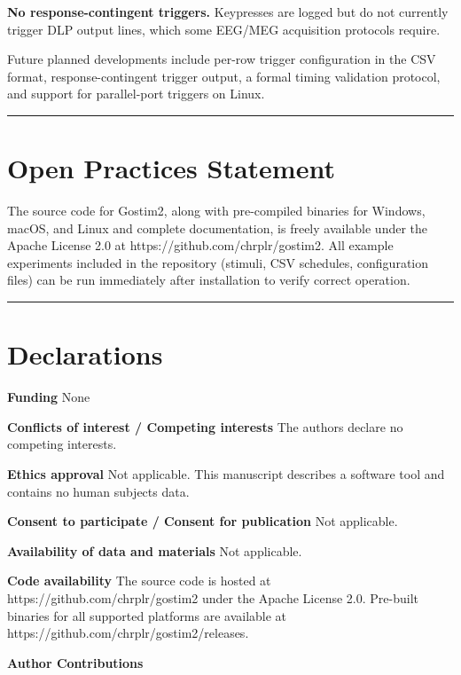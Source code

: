 \documentclass[
  11pt,
]{article}
\begin{document}
\textbf{No response-contingent triggers.} Keypresses are logged but do
not currently trigger DLP output lines, which some EEG/MEG acquisition
protocols require.

Future planned developments include per-row trigger configuration in the
CSV format, response-contingent trigger output, a formal timing
validation protocol, and support for parallel-port triggers on Linux.

\begin{center}\rule{0.5\linewidth}{0.5pt}\end{center}

\section{Open Practices Statement}\label{open-practices-statement}

The source code for Gostim2, along with pre-compiled binaries for
Windows, macOS, and Linux and complete documentation, is freely
available under the Apache License 2.0 at
https://github.com/chrplr/gostim2. All example experiments included in
the repository (stimuli, CSV schedules, configuration files) can be run
immediately after installation to verify correct operation.

\begin{center}\rule{0.5\linewidth}{0.5pt}\end{center}

\section{Declarations}\label{declarations}

\textbf{Funding} None

\textbf{Conflicts of interest / Competing interests} The authors declare
no competing interests.

\textbf{Ethics approval} Not applicable. This manuscript describes a
software tool and contains no human subjects data.

\textbf{Consent to participate / Consent for publication} Not
applicable.

\textbf{Availability of data and materials} Not applicable.

\textbf{Code availability} The source code is hosted at
https://github.com/chrplr/gostim2 under the Apache License 2.0.
Pre-built binaries for all supported platforms are available at
https://github.com/chrplr/gostim2/releases.

\textbf{Author Contributions}
\end{document}

